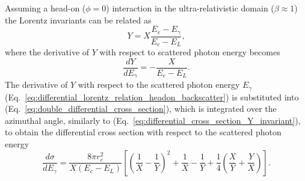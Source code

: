 \documentclass[../main.tex]{subfiles}
\begin{document}
Assuming a head-on ($\phi=0$) interaction in the ultra-relativistic domain ($\beta\approx1$) the Lorentz invariants can be related as
\begin{equation}
Y = X\frac{E_{e}-E_{\gamma}}{E_{e}-E_{L}},
\label{eq:lorentz_relation_headon_backscatter}
\end{equation}
where the derivative of $Y$ with respect to scattered photon energy becomes
\begin{equation}
\frac{dY}{dE_{\gamma}} = -\frac{X}{E_{e}-E_{L}}.
\label{eq:differential_lorentz_relation_headon_backscatter}
\end{equation}
The derivative of $Y$ with respect to the scattered photon energy $E_{\gamma}$ (Eq.~\ref{eq:differential_lorentz_relation_headon_backscatter}) is substituted into (Eq.~\ref{eq:double_differential_cross_section}), which is integrated over the azimuthal angle, similarly to (Eq.~\ref{eq:differential_cross_section_Y_invariant}), to obtain the differential cross section with respect to the scattered photon energy
\begin{equation}
\frac{d\sigma}{dE_{\gamma}} = \frac{8\pi r_{e}^{2}}{X\left(E_{e}-E_{L}\right)}\left[\left(\frac{1}{X}-\frac{1}{Y}\right)^{2}+\frac{1}{X}-\frac{1}{Y}+\frac{1}{4}\left(\frac{X}{Y}+\frac{Y}{X}\right)\right].
\label{eq:differential_cross_section_ICS_energy}    
\end{equation}
\end{document}
